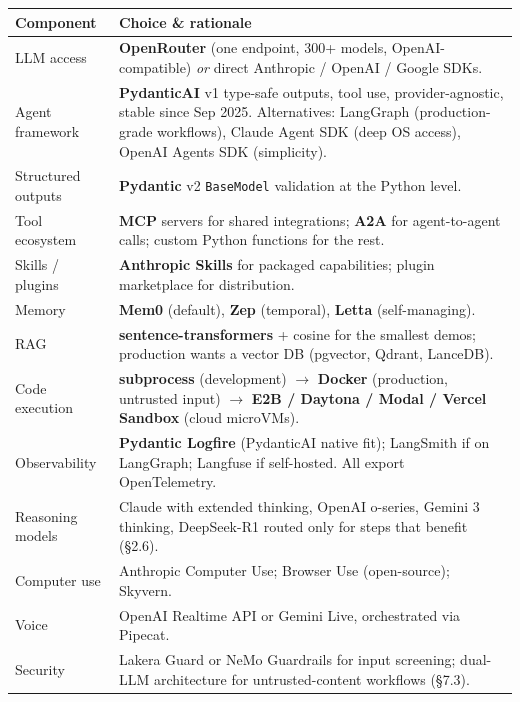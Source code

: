 \documentclass[a4paper,11pt]{article}
\begin{document}
\begin{center}\small
\begin{tabular}{p{3.4cm} p{9.4cm}}
  \toprule
  \textbf{Component} & \textbf{Choice \& rationale} \\
  \midrule
  LLM access        & \textbf{OpenRouter} (one endpoint, 300+ models, OpenAI-compatible) \emph{or} direct Anthropic / OpenAI / Google SDKs. \\
  Agent framework   & \textbf{PydanticAI} v1 \textemdash{} type-safe outputs, tool use, provider-agnostic, stable since Sep 2025. Alternatives: LangGraph (production-grade workflows), Claude Agent SDK (deep OS access), OpenAI Agents SDK (simplicity). \\
  Structured outputs & \textbf{Pydantic} v2 \texttt{BaseModel} \textemdash{} validation at the Python level. \\
  Tool ecosystem    & \textbf{MCP} servers for shared integrations; \textbf{A2A} for agent-to-agent calls; custom Python functions for the rest. \\
  Skills / plugins  & \textbf{Anthropic Skills} for packaged capabilities; plugin marketplace for distribution. \\
  Memory            & \textbf{Mem0} (default), \textbf{Zep} (temporal), \textbf{Letta} (self-managing). \\
  RAG               & \textbf{sentence-transformers} + cosine for the smallest demos; production wants a vector DB (pgvector, Qdrant, LanceDB). \\
  Code execution    & \textbf{subprocess} (development) $\to$ \textbf{Docker} (production, untrusted input) $\to$ \textbf{E2B / Daytona / Modal / Vercel Sandbox} (cloud microVMs). \\
  Observability     & \textbf{Pydantic Logfire} (PydanticAI native fit); LangSmith if on LangGraph; Langfuse if self-hosted. All export OpenTelemetry. \\
  Reasoning models  & Claude with extended thinking, OpenAI o-series, Gemini 3 thinking, DeepSeek-R1 \textemdash{} routed only for steps that benefit (§2.6). \\
  Computer use      & Anthropic Computer Use; Browser Use (open-source); Skyvern. \\
  Voice             & OpenAI Realtime API or Gemini Live, orchestrated via Pipecat. \\
  Security          & Lakera Guard or NeMo Guardrails for input screening; dual-LLM architecture for untrusted-content workflows (§7.3). \\
  \bottomrule
\end{tabular}
\end{center}
\end{document}
